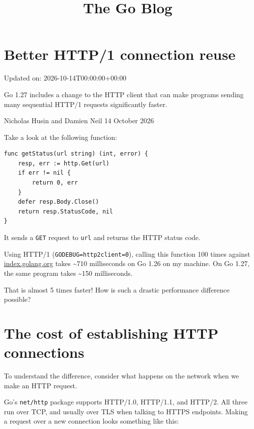 \documentclass[11pt,a4paper]{article}
\title{The Go Blog}
\begin{document}
\maketitle

\section{Better HTTP/1 connection reuse}

Updated on: 2026-10-14T00:00:00+00:00

Go 1.27 includes a change to the HTTP client that can make programs sending many sequential HTTP/1 requests significantly faster.

Nicholas Husin and Damien Neil
14 October 2026

Take a look at the following function:

\begin{verbatim}
func getStatus(url string) (int, error) {
    resp, err := http.Get(url)
    if err != nil {
        return 0, err
    }
    defer resp.Body.Close()
    return resp.StatusCode, nil
}
\end{verbatim}

It sends a \texttt{GET} request to \texttt{url} and returns the HTTP status code.

Using HTTP/1 (\texttt{GODEBUG=http2client=0}), calling this function 100 times against \href{https://index.golang.org/}{index.golang.org} takes \textasciitilde{}710 milliseconds on Go 1.26 on my machine. On Go 1.27, the same program takes \textasciitilde{}150 milliseconds.

That is almost 5 times faster! How is such a drastic performance difference possible?

\section{The cost of establishing HTTP connections}

To understand the difference, consider what happens on the network when we make an HTTP request.

Go's \texttt{net/http} package supports HTTP/1.0, HTTP/1.1, and HTTP/2. All three run over TCP, and usually over TLS when talking to HTTPS endpoints. Making a request over a new connection looks something like this:

\begin{figure}[h]
\end{figure}
\end{document}
